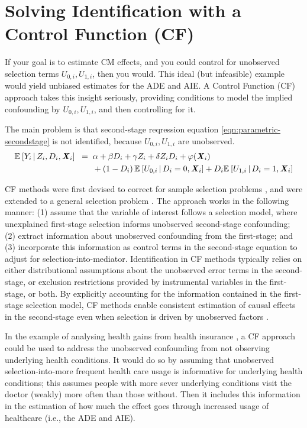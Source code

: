 \section{Solving Identification with a Control Function (CF)}
\label{sec:selectionmodel}
If your goal is to estimate CM effects, and you could control for unobserved selection terms $U_{0,i}, U_{1,i}$, then you would.
This ideal (but infeasible) example would yield unbiased estimates for the ADE and AIE.
A Control Function (CF) approach takes this insight seriously, providing conditions to model the implied confounding by $U_{0,i}, U_{1,i}$, and then controlling for it.

The main problem is that second-stage reqression equation \eqref{eqn:parametric-secondstage} is not identified, because $U_{0,i},U_{1,i}$ are unobserved.
\begin{align}
    \label{eqn:secondstage-reg}
    \mathbb{E}_{} \left[ Y_i \, \middle\vert \, Z_i, D_i, \boldsymbol{\mathit{X}}_i \right] \;\; =& \;\;
        \alpha
        + \beta D_i
        + \gamma Z_i
        + \delta Z_i D_i
        + \varphi(\boldsymbol{\mathit{X}}_i) \\
        & \;\; +\left( 1 - D_i \right) \mathbb{E}_{} \left[  U_{0,i}  \, \middle\vert \, D_i = 0, \boldsymbol{\mathit{X}}_i \right]
            + D_i \mathbb{E}_{} \left[  U_{1,i}  \, \middle\vert \, D_i = 1, \boldsymbol{\mathit{X}}_i \right] 
        \nonumber
\end{align}

CF methods were first devised to correct for sample selection problems \citep{heckman1974shadow}, and were extended to a general selection problem \citep{heckman1979sample}.
The approach works in the following manner: (1) assume that the variable of interest follows a selection model, where unexplained first-stage selection informs unobserved second-stage confounding; (2) extract information about unobserved confounding from the first-stage; and (3) incorporate this information as control terms in the second-stage equation to adjust for selection-into-mediator.
Identification in CF methods typically relies on either distributional assumptions about the unobserved error terms in the second-stage, or exclusion restrictions provided by instrumental variables in the first-stage, or both.
By explicitly accounting for the information contained in the first-stage selection model, CF methods enable consistent estimation of causal effects in the second-stage even when selection is driven by unobserved factors \citep{florens2008identification}.

In the example of analysing health gains from health insurance \citep{finkelstein2008oregon}, a CF approach could be used to address the unobserved confounding from not observing underlying health conditions.
It would do so by assuming that unobserved selection-into-more frequent health care usage is informative for underlying health conditions; this assumes people with more sever underlying conditions visit the doctor (weakly) more often than those without.
Then it includes this information in the estimation of how much the effect goes through increased usage of healthcare (i.e., the ADE and AIE).


